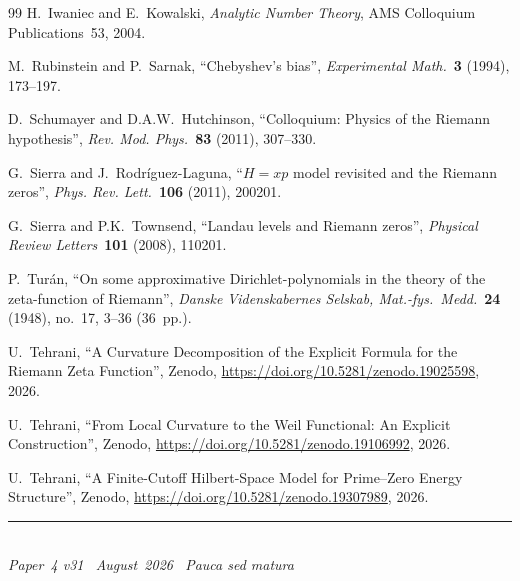 \documentclass[11pt]{article}
\begin{document}
\begin{thebibliography}{99}
H.~Iwaniec and E.~Kowalski,
\emph{Analytic Number Theory},
AMS Colloquium Publications~53, 2004.

M.~Rubinstein and P.~Sarnak,
``Chebyshev's bias'',
\emph{Experimental Math.}\ \textbf{3} (1994), 173--197.

D.~Schumayer and D.A.W.~Hutchinson,
``Colloquium: Physics of the Riemann hypothesis'',
\emph{Rev. Mod. Phys.}\ \textbf{83} (2011), 307--330.

G.~Sierra and J.~Rodr\'iguez-Laguna,
``$H=xp$ model revisited and the Riemann zeros'',
\emph{Phys. Rev. Lett.}\ \textbf{106} (2011), 200201.

G.~Sierra and P.K.~Townsend,
``Landau levels and Riemann zeros'',
\emph{Physical Review Letters}\ \textbf{101} (2008), 110201.

P.~Tur\'an,
``On some approximative Dirichlet-polynomials in the theory of
the zeta-function of Riemann'',
\emph{Danske Videnskabernes Selskab, Mat.-fys.\ Medd.}\
\textbf{24} (1948), no.~17, 3--36 (36~pp.).

U.~Tehrani,
``A Curvature Decomposition of the Explicit Formula
for the Riemann Zeta Function'',
Zenodo, \url{https://doi.org/10.5281/zenodo.19025598}, 2026.

U.~Tehrani,
``From Local Curvature to the Weil Functional: An Explicit Construction'',
Zenodo, \url{https://doi.org/10.5281/zenodo.19106992}, 2026.

U.~Tehrani,
``A Finite-Cutoff Hilbert-Space Model
for Prime--Zero Energy Structure'',
Zenodo, \url{https://doi.org/10.5281/zenodo.19307989}, 2026.

\end{thebibliography}

\enlargethispage{3\baselineskip}
\vspace*{\fill}
\begin{minipage}{\linewidth}
\rule{\linewidth}{0.4pt}\smallskip\\
\small\emph{Paper~4 v31 \textperiodcentered\ August~2026
\textperiodcentered\ Pauca sed matura}
\end{minipage}
\end{document}
